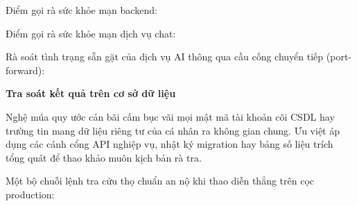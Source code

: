 Điểm gọi rà sức khỏe mạn backend:

\begin{Shaded}
\begin{Highlighting}[]
 
\end{Highlighting}
\end{Shaded}

Điểm gọi rà sức khỏe mạn dịch vụ chat:

\begin{Shaded}
\begin{Highlighting}[]
 
\end{Highlighting}
\end{Shaded}

Rà soát tình trạng sẵn gặt của dịch vụ AI thông qua cầu cống chuyển tiếp
(port-forward):

\begin{Shaded}
\begin{Highlighting}[]
 
\end{Highlighting}
\end{Shaded}

\vspace{0.5em}\noindent\textbf{Tra soát kết quả trên cơ sở dữ
liệu}\par

Nghệ múa quy ước cản bãi cấm bục vãi mọi mật mã tài khoản cõi CSDL hay
trường tin mang dữ liệu riêng tư của cá nhân ra không gian chung. Ưu
việt áp dụng các cánh cổng API nghiệp vụ, nhật ký migration hay bảng số
liệu trích tổng quát để thao khảo muôn kịch bản rà tra.

Một bộ chuỗi lệnh tra cứu thọ chuẩn an nộ khi thao diễn thẳng trên cọc
production:

\begin{Shaded}
\begin{Highlighting}[]
\OperatorTok{=}
\OperatorTok{=}
\OperatorTok{=}
\end{Highlighting}
\end{Shaded}

